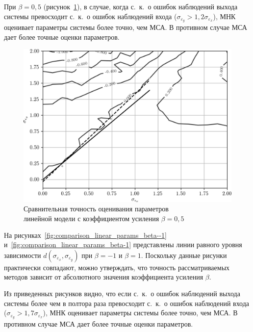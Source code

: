 При \( \beta = 0{,}5 \) (рисунок~\ref{fig:comparison_linear_params_beta-0,5}),
в случае, когда с.~к.~о ошибок наблюдений выхода системы превосходит
с.~к.~о ошибок наблюдений входа (\(\sigma_{\varepsilon_y} > 1{,}2 \sigma_{\varepsilon_x}\)),
МНК оценивает параметры системы более точно, чем МСА.
В противном случае МСА дает более точные оценки параметров.

\begin{figure}[h]
  \centering
  \includegraphics[width=135mm]{fig/linear/param/beta-0,5_param-accs-approx.png}
  \caption{%
    Сравнительная точность оценивания параметров \\
    линейной модели с коэффициентом усиления \( \beta = 0{,}5 \)
  }\label{fig:comparison_linear_params_beta-0,5}
\end{figure}

На рисунках~\ref{fig:comparison_linear_params_beta--1} и~\ref{fig:comparison_linear_params_beta-1}
представлены линии равного уровня зависимости \( d(\sigma_{\varepsilon_x}, \sigma_{\varepsilon_y}) \)
при \( \beta = -1 \) и \( \beta = 1 \).
Поскольку данные рисунки практически совпадают, можно утверждать, что точность рассматриваемых методов
зависит от абсолютного значения коэффициента усиления \( \beta \).

Из приведенных рисунков видно, что если с.~к.~о ошибок наблюдений выхода системы
более чем в полтора раза превосходит с.~к.~о ошибок наблюдений входа
(\( \sigma_{\varepsilon_y} > 1{,}7 \sigma_{\varepsilon_x} \)),
МНК оценивает параметры системы более точно, чем МСА.
В противном случае МСА дает более точные оценки параметров.

